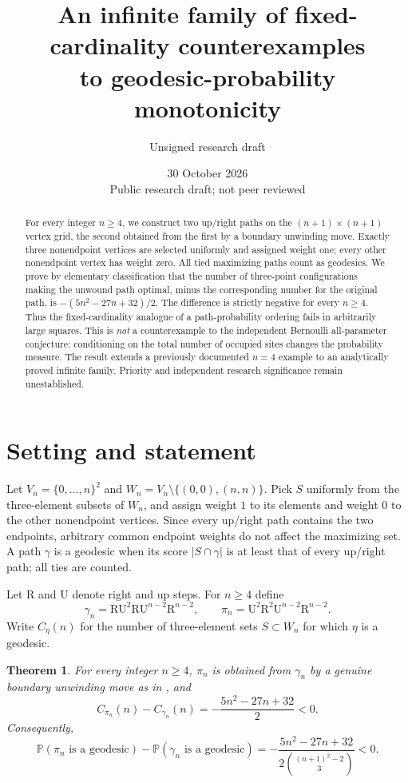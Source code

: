 \documentclass[11pt,a4paper]{article}
\title{An infinite family of fixed-cardinality counterexamples\\
to geodesic-probability monotonicity}
\author{Unsigned research draft}
\date{30 October 2026\\\small Public research draft; not peer reviewed}
\newtheorem{theorem}{Theorem}
\newcommand{\R}{\mathrm R}
\newcommand{\U}{\mathrm U}
\newcommand{\Prob}{\mathbb P}
\begin{document}
\maketitle
\begin{abstract}
For every integer $n\geq4$, we construct two up/right paths on the
$(n+1)\times(n+1)$ vertex grid, the second obtained from the first by a
boundary unwinding move. Exactly three nonendpoint vertices are selected
uniformly and assigned weight one; every other nonendpoint vertex has
weight zero. All tied maximizing paths count as geodesics. We prove by
elementary classification that the number of three-point configurations
making the unwound path optimal, minus the corresponding number for the
original path, is $-(5n^2-27n+32)/2$. The difference is strictly
negative for every $n\geq4$. Thus the fixed-cardinality analogue of a
path-probability ordering fails in arbitrarily large squares. This is
\emph{not} a counterexample to the independent Bernoulli all-parameter
conjecture: conditioning on the total number of occupied sites changes the
probability measure. The result extends a previously documented $n=4$
example to an analytically proved infinite family. Priority and independent
research significance remain unestablished.
\end{abstract}

\section{Setting and statement}
Let $V_n=\{0,\ldots,n\}^2$ and
$W_n=V_n\setminus\{(0,0),(n,n)\}$. Pick $S$ uniformly from the
three-element subsets of $W_n$, and assign weight $1$ to its elements
and weight $0$ to the other nonendpoint vertices. Since every up/right
path contains the two endpoints, arbitrary common endpoint weights do
not affect the maximizing set. A path $\gamma$ is a geodesic when its
score $|S\cap\gamma|$ is at least that of every up/right path; all ties
are counted.

Let $\R$ and $\U$ denote right and up steps. For $n\ge4$ define
\[
 \gamma_n=\R\U^2\R\U^{n-2}\R^{n-2},
 \qquad
 \pi_n=\U^2\R^2\U^{n-2}\R^{n-2}.
\]
Write $C_\eta(n)$ for the number of three-element sets $S\subset W_n$
for which $\eta$ is a geodesic.

\begin{theorem}\label{thm:main}
For every integer $n\ge4$, $\pi_n$ is obtained from $\gamma_n$ by a
genuine boundary unwinding move as in \cite[Section~2]{MN}, and
\[
 C_{\pi_n}(n)-C_{\gamma_n}(n)
 =-\frac{5n^2-27n+32}{2}<0.
\]
Consequently,
\[
 \Prob(\pi_n\text{ is a geodesic})-
 \Prob(\gamma_n\text{ is a geodesic})
 =-\frac{5n^2-27n+32}
 {2\binom{(n+1)^2-2}{3}}<0.
\]
\end{theorem}
\end{document}
